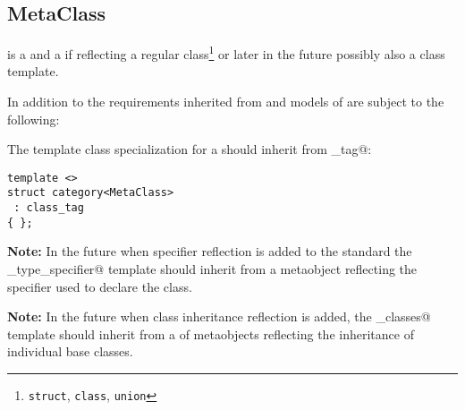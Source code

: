 \subsection{MetaClass}
\label{concept-MetaClass}

 is a  and a  if reflecting a regular
class\footnote{\texttt{struct}, \texttt{class}, \texttt{union}} or later in the future possibly
also a class template.

In addition to the requirements inherited from  and 
models of  are subject to the following:

The \verb@category@ template class specialization for a  should
inherit from \verb@class_tag@:

\begin{verbatim}
template <>
struct category<MetaClass>
 : class_tag
{ };
\end{verbatim}

\textbf{Note:} In the future when specifier reflection is added
to the standard the \verb@elaborated_type_specifier@ template
should inherit from a metaobject reflecting the specifier used
to declare the class.

\textbf{Note:} In the future when class inheritance reflection
is added, the \verb@base_classes@ template should inherit from
a  of metaobjects reflecting the
inheritance of individual base classes.

